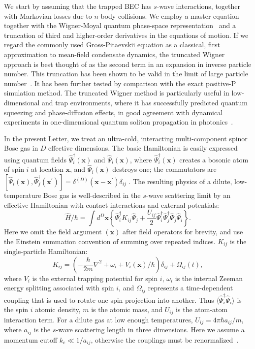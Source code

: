 \documentclass[aps,prl,twocolumn,showpacs,amsmath,amssymb,superscriptaddress,flushbottom,noraggedfooter]{revtex4-1}
\newcommand{\xvec}{\boldsymbol{x}}
\begin{document}
We start by assuming that the trapped BEC has $s$-wave interactions,
together with Markovian losses due to $n$-body collisions.
We employ a master equation together with the Wigner-Moyal quantum phase-space representation~\cite{Gardiner2004}
and a truncation of third and higher-order derivatives in the equations of motion.
If we regard the commonly used Gross-Pitaevskii equation as a classical,
first approximation to mean-field condensate dynamics,
the truncated Wigner approach is best thought of as the second term in an expansion in inverse particle number.
This truncation has been shown to be valid in the limit of large particle
number~\cite{Drummond1993,Steel1998,Sinatra2002}.
It has been further tested by comparison with the exact positive-P simulation method.
The truncated Wigner method is particularly useful in low-dimensional and
trap environments, where it has successfully predicted quantum squeezing
and phase-diffusion effects, in good agreement with dynamical experiments
in one-dimensional quantum soliton propagation in photonics~\cite{Carter1987,Corney2008}.

In the present Letter, we treat an ultra-cold,
interacting multi-component spinor Bose gas in $D$ effective dimensions.
The basic Hamiltonian is easily expressed using quantum fields
$\widehat{\Psi}_{i}^{\dagger}(\xvec)$ and $\widehat{\Psi}_{i}(\xvec)$,
where $\widehat{\Psi}_{i}^{\dagger}(\xvec)$ creates a bosonic atom of spin $i$
at location $\xvec$, and $\widehat{\Psi}_{i}(\xvec)$ destroys one;
the commutators are
$[\widehat{\Psi}_{i}(\xvec),\widehat{\Psi}_{j}^{\dagger}(\xvec^\prime)] =
\delta^{(D)}(\xvec-\xvec^\prime)\delta_{ij}\,\,.$
The resulting physics of a dilute, low-temperature Bose gas
is well-described in the $s$-wave scattering limit by an effective Hamiltonian
with contact interactions and external potentials:
\begin{equation}
	\hat{H} / \hbar = \int d^{D}\xvec \left\{
		\widehat{\Psi}_{i}^{\dagger} K_{ij} \widehat{\Psi}_{j} +
		\frac{U_{ij}}{2} \widehat{\Psi}_{i}^{\dagger} \widehat{\Psi}_{j}^{\dagger}
		\widehat{\Psi}_{j} \widehat{\Psi}_{i}
	\right\}.
\end{equation}
Here we omit the field argument $(\xvec)$ after field operators for brevity,
and use the Einstein summation convention of summing over repeated indices.
$K_{ij}$ is the single-particle Hamiltonian:
\begin{equation}
	K_{ij} = \left( -\frac{\hbar}{2m} \nabla^2 + \omega_i + V_i(\xvec) / \hbar \right) \delta_{ij} +
		\Omega_{ij}(t),
\end{equation}
where $V_{i}$ is the external trapping potential for spin $i$,
$\omega_{i}$ is the internal Zeeman energy splitting associated with spin $i$,
and $\Omega_{ij}$ represents a time-dependent coupling
that is used to rotate one spin projection into another.
Thus $\langle \widehat{\Psi}_{i}^{\dagger} \widehat{\Psi}_{i} \rangle$
is the spin $i$ atomic density, $m$ is the atomic mass,
and $U_{ij}$ is the atom-atom interaction term.
For a dilute gas at low enough temperatures,
$U_{ij}=4\pi\hbar a_{ij} / m$, where $a_{ij}$ is the $s$-wave scattering length in three dimensions.
Here we assume a momentum cutoff $k_{c} \ll 1 / a_{ij}$,
otherwise the couplings must be renormalized~\cite{Sinatra2002}.
\end{document}
